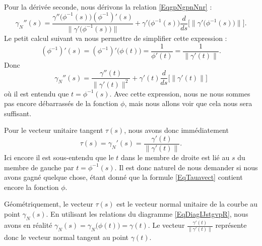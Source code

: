 Pour la dérivée seconde, nous dérivons la relation \eqref{EqgpNgpnNnr} :
\begin{equation}
	\gamma_N''(s)=\frac{ \gamma''\big( \phi^{-1}(s) \big)(\phi^{-1})'(s) }{ \| \gamma'\big( \phi^{-1}(s) \big) \| }+\gamma'\big( \phi^{-1}(s) \big)\frac{ d }{ ds }\Big[ \| \gamma'\big( \phi^{-1}(s) \big) \| \Big].
\end{equation}
Le petit calcul suivant va nous permettre de simplifier cette expression :
\begin{equation}        \label{Eavpemuetfpnorm}
	(\phi^{-1})'(s)=(\phi^{-1})'\big( \phi(t) \big)=\frac{1}{ \phi'(t) }=\frac{1}{ \| \gamma'(t) \| }.
\end{equation}
Donc
\begin{equation}
	\gamma_N''(s)=\frac{ \gamma''(t) }{ \| \gamma'(t) \|^2 }+\gamma'(t)\frac{ d }{ ds }\Big[ \| \gamma'(t) \| \Big]
\end{equation}
où il est entendu que \( t=\phi^{-1}(s)\). Avec cette expression, nous ne nous sommes pas encore débarrassés de la fonction \( \phi\), mais nous allons voir que cela nous sera suffisant.

Pour le vecteur unitaire tangent \( \tau(s)\), nous avons donc immédiatement
\begin{equation}        \label{EqTauavect}
	\tau(s)=\gamma_N'(s)=\frac{ \gamma'(t) }{ \| \gamma'(t) \| }.
\end{equation}
Ici encore il est sous-entendu que le \( t\) dans le membre de droite est lié au \( s\) du membre de gauche par \( t=\phi^{-1}(s)\). Il est donc naturel de nous demander si nous avons gagné quelque chose, étant donné que la formule \eqref{EqTauavect} contient encore la fonction \( \phi\).

Géométriquement, le vecteur \( \tau(s)\) est le vecteur normal unitaire de la courbe au point \( \gamma_N(s)\). En utilisant les relations du diagramme \eqref{EqDiagIJstgvpR}, nous avons en réalité \( \gamma_N(s)=\gamma_N\big( \phi(t) \big)=\gamma(t)\). Le vecteur \( \frac{ \gamma'(t) }{ \| \gamma'(t) \| }\) représente donc le vecteur normal tangent au point \( \gamma(t)\).

